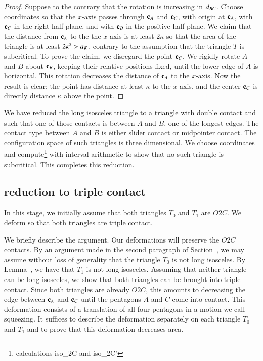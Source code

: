 \begin{proof} Suppose to the contrary that the rotation is increasing in $d_{BC}$.  Choose coordinates so that the $x$-axis passes
through ${\mathbf c}_A$ and ${\mathbf c}_C$, with origin at ${\mathbf c}_A$, with ${\mathbf c}_C$ in the right half-plane, and with ${\mathbf c}_B$ in the positive half-plane.
We claim that the distance from ${\mathbf c}_A$ to the the $x$-axis is at least $2\kappa$ so that the area of the triangle is at least $2\kappa^2 > a_K$,
contrary to the assumption that the triangle $T$ is subcritical.   To prove the claim, we disregard the point ${\mathbf c}_C$.  We rigidly rotate
$A$ and $B$ about ${\mathbf c}_B$, keeping their relative positions fixed, until the lower edge of $A$ is horizontal.  This rotation decreases the
distance of ${\mathbf c}_A$ to the $x$-axis.  Now the result is clear: the point has distance at least $\kappa$ to the $x$-axis, and the center ${\mathbf c}_C$ is
directly distance $\kappa$ above the point.
\end{proof}

We have reduced the long isosceles triangle to a triangle with double contact and such that one of those contacts is between $A$ and $B$, one of the
longest edges.  The contact type between $A$ and $B$ is either slider contact or midpointer contact.  The configuration space of such triangles is
three dimensional.  We choose coordinates and compute\footnote{calculations iso\_2C and iso\_2C'} 
with interval arithmetic to show that no such triangle is subcritical.  This completes this reduction.

\subsection{reduction to triple contact}

In this stage, we initially assume that both triangles $T_0$ and $T_1$ are $O2C$.
We deform so that both triangles are triple contact.

We briefly describe the argument.   Our deformations will preserve the $O2C$ contacts.  By an argument made in the second paragraph of Section~,
we may assume without loss of generality that the triangle $T_0$ is not long isosceles.   By Lemma~, we have that $T_1$ is not long
isosceles.
Assuming that neither triangle can be long isosceles,
 we show that both triangles can be brought into triple contact.  Since both triangles are already $O2C$, this amounts
to decreasing the edge between ${\mathbf c}_A$ and ${\mathbf c}_C$ until the pentagons $A$ and $C$ come into contact.
This deformation consists of a translation of all four pentagons in a motion we call squeezing.  It suffices to describe the deformation separately on
each triangle $T_0$ and $T_1$ and to prove that this deformation decreases area.  

